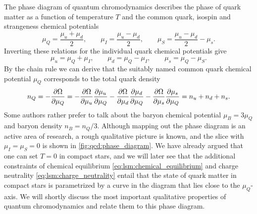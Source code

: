 The phase diagram of quantum chromodynamics describes the phase of quark matter
as a function of temperature $T$ and the common quark, isospin and strangeness chemical potentials
\begin{equation}
	\mu_Q = \frac{\mu_u + \mu_d}{2}, \qquad
	\mu_I = \frac{\mu_u - \mu_d}{2}, \qquad
	\mu_S = \frac{\mu_u - \mu_d}{2} - \mu_s.
\label{eq:master_intro:chemical_potentials_transformed}
\end{equation}
Inverting these relations for the individual quark chemical potentials give
\begin{equation}
	\mu_u = \mu_Q + \mu_I, \qquad
	\mu_d = \mu_Q - \mu_I, \qquad
	\mu_s = \mu_Q - \mu_S .
\label{eq:master_intro:chemical_potentials_particles}
\end{equation}
By the chain rule we can derive that the suitably named common quark chemical potential $\mu_Q$ corresponds to the total quark density
\begin{equation}
	n_Q = -\pdv{\Omega}{\mu_Q} =
	-\pdv{\Omega}{\mu_u} \pdv{\mu_u}{\mu_Q}
	-\pdv{\Omega}{\mu_d} \pdv{\mu_d}{\mu_Q}
	-\pdv{\Omega}{\mu_s} \pdv{\mu_s}{\mu_Q} =
	n_u + n_d + n_s.
\end{equation}
Some authors rather prefer to talk about the baryon chemical potential $\mu_B = 3 \mu_Q$ and baryon density $n_B = n_Q / 3$.
Although mapping out the phase diagram is an active area of research, a rough qualitative picture is known, and the slice with $\mu_I = \mu_S = 0$ is shown in \cref{fig:qcd:phase_diagram}.
We have already argued that one can set $T=0$ in compact stars,
and we will later see that the additional constraints of chemical equilibrium \eqref{eq:lsm:chemical_equilibrium} and charge neutrality \eqref{eq:lsm:charge_neutrality} entail that
the state of quark matter in compact stars is parametrized by a curve in the diagram that lies close to the $\mu_Q$-axis.
We will shortly discuss the most important qualitative properties of quantum chromodynamics and relate them to this phase diagram.

